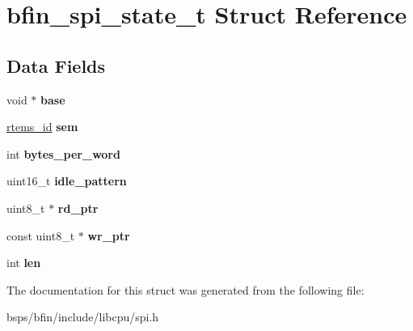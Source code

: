 \hypertarget{structbfin__spi__state__t}{}\section{bfin\+\_\+spi\+\_\+state\+\_\+t Struct Reference}
\label{structbfin__spi__state__t}
\subsection*{Data Fields}
\begin{DoxyCompactItemize}
\item 
\mbox{\label{structbfin__spi__state__t_a8d3032cad9f0b7e0c28165becbf4bdf9}} 
void $\ast$ {\bfseries base}
\item 
\mbox{\label{structbfin__spi__state__t_a950b4686a53c980c4f3f40e9fd73c387}} 
\mbox{\hyperlink{group__ClassicTasks_gab20892b814dced7dd4e5b9bf42becd57}{rtems\+\_\+id}} {\bfseries sem}
\item 
\mbox{\label{structbfin__spi__state__t_aadb9478dee342f6ea287bd0701c3e3ab}} 
int {\bfseries bytes\+\_\+per\+\_\+word}
\item 
\mbox{\label{structbfin__spi__state__t_a0f059d04975d3ddb7aa2faa06f70ec5a}} 
uint16\+\_\+t {\bfseries idle\+\_\+pattern}
\item 
\mbox{\label{structbfin__spi__state__t_aff636efdb80dadccd49ff0549141b553}} 
uint8\+\_\+t $\ast$ {\bfseries rd\+\_\+ptr}
\item 
\mbox{\label{structbfin__spi__state__t_a613b21acbb729173d9173cc5bc718388}} 
const uint8\+\_\+t $\ast$ {\bfseries wr\+\_\+ptr}
\item 
\mbox{\label{structbfin__spi__state__t_ace2dba07752603f9e8c147d6650781a4}} 
int {\bfseries len}
\end{DoxyCompactItemize}


The documentation for this struct was generated from the following file\+:\begin{DoxyCompactItemize}
\item 
bsps/bfin/include/libcpu/spi.\+h\end{DoxyCompactItemize}
